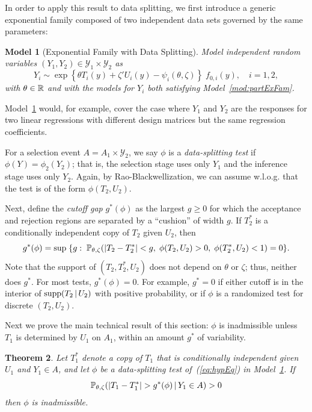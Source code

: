\documentclass{article}
\newtheorem{theorem}{Theorem}
\newtheorem{model}[theorem]{Model}
\theoremstyle{definition}
\newcommand{\cY}{\mathcal{Y}}
\newcommand{\capSampOrData}{Data }
\begin{document}
In order to apply this result to data splitting, we first introduce a generic exponential family composed of two independent data sets governed by the same parameters:
\begin{model}[Exponential Family with \capSampOrData Splitting]\label{mod:ss}
Model independent random variables $(Y_{1},Y_{2}) \in \cY_1 \times \cY_2$ as
\begin{equation}
  Y_{i} \sim \exp\left\{\theta T_{i}(y) + \zeta ' U_{i}(y) - \psi_{i}(\theta,\zeta)\right\}\; f_{0,i}(y),\quad i=1,2,
\end{equation}
with $\theta\in\R$ and with the models for $Y_{i}$ both satisfying Model~\ref{mod:partExFam}.
\end{model}
Model~\ref{mod:ss} would, for example, cover the case where $Y_1$ and $Y_2$ are the responses for two linear regressions with different design matrices but the same regression coefficients.

For a selection event ${A = A_1 \times \cY_2}$, we say $\phi$ is a
{\em data-splitting test} if $\phi(Y) = \phi_2(Y_2)$; that is, the selection stage uses only $Y_{1}$ and the inference stage uses only $Y_{2}$. Again, by Rao-Blackwellization, we can assume w.l.o.g. that the test is of the form $\phi(T_2, U_2)$.

Next, define the {\em cutoff gap} $g^*(\phi)$ as the largest $g\geq 0$ for which the acceptance and rejection regions are separated by a ``cushion'' of width $g$. If $T_2^*$ is a conditionally independent copy of $T_2$ given $U_2$, then
\begin{equation}\label{eq:gapEvent}
  g^*(\phi) = \sup \;\{g: \; \P_{\theta,\zeta}( | T_2 - T_2^*| < g,\; \phi(T_2,U_2)>0, \;\phi(T_2^*,U_2)<1) = 0\}.
\end{equation}
Note that the support of $(T_2,T_2^*,U_2)$ does not depend on $\theta$ or $\zeta$; thus, neither does $g^*$. For most tests, $g^*(\phi)=0$. For example, $g^*=0$ if either cutoff is in the interior of $\text{supp}(T_2\gv U_2)$ with positive probability, or if $\phi$ is a randomized test for discrete $(T_2,U_2)$.

Next we prove the main technical result of this section: $\phi$ is inadmissible unless $T_1$ is determined by $U_1$ on $A_1$, within an amount $g^*$ of variability.

\begin{theorem}\label{thm:ssInadm}
Let $T_1^*$ denote a copy of $T_1$ that is conditionally independent given $U_1$ and $Y_1\in A$, and let $\phi$ be a data-splitting test of~(\ref{eq:hypEq}) in Model~\ref{mod:ss}. If
\[
\P_{\theta,\zeta}(|T_1-T_1^*| > g^*(\phi) \gv Y_1\in A) > 0
\]
then $\phi$ is inadmissible.
\end{theorem}
\end{document}
